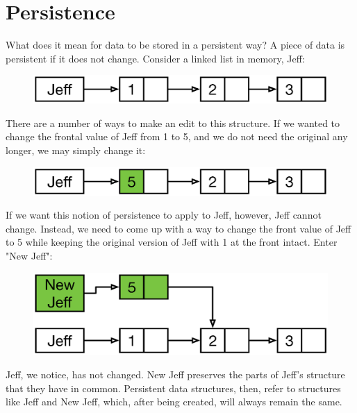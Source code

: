 \documentclass[preprint]{sigplanconf}
\begin{document}
\section{Persistence}
What does it mean for data to be stored in a persistent way?
A piece of data is persistent if it does not change.
Consider a linked list in memory, Jeff:
\begin{figure}[H]
\includegraphics[scale=.35]{linkedlist}
\centering
\end{figure}
There are a number of ways to make an edit to this structure.
If we wanted to change the frontal value of Jeff from 1 to 5, and we do not need the original any longer, we may simply change it:
\begin{figure}[H]
\includegraphics[scale=.35]{linkedlist2}
\centering
\end{figure}
If we want this notion of persistence to apply to Jeff, however, Jeff cannot change.
Instead, we need to come up with a way to change the front value of Jeff to 5 while keeping the original version of Jeff with 1 at the front intact.
Enter "New Jeff":
\begin{figure}[H]
\includegraphics[scale=.35]{linkedlist3}
\centering
\end{figure}
Jeff, we notice, has not changed.
New Jeff preserves the parts of Jeff's structure that they have in common.
Persistent data structures, then, refer to structures like Jeff and New Jeff, which, after being created, will always remain the same.
\end{document}
